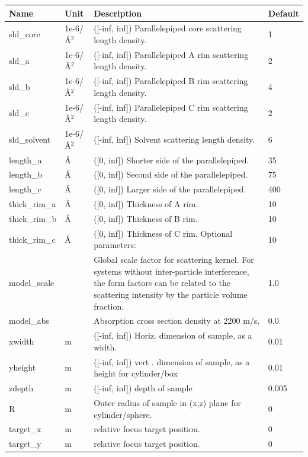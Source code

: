 \begin{longtable}{p{}p{}p{}p{}}
\toprule
\textbf{Name} & \textbf{Unit} & \textbf{Description} & \textbf{Default} \\
\midrule
\endhead
sld\_core & 1e-6/\AA{}$^{2}$ & ([-inf, inf]) Parallelepiped core scattering length density. & 1 \\
sld\_a & 1e-6/\AA{}$^{2}$ & ([-inf, inf]) Parallelepiped A rim scattering length density. & 2 \\
sld\_b & 1e-6/\AA{}$^{2}$ & ([-inf, inf]) Parallelepiped B rim scattering length density. & 4 \\
sld\_c & 1e-6/\AA{}$^{2}$ & ([-inf, inf]) Parallelepiped C rim scattering length density. & 2 \\
sld\_solvent & 1e-6/\AA{}$^{2}$ & ([-inf, inf]) Solvent scattering length density. & 6 \\
length\_a & \AA{} & ([0, inf]) Shorter side of the parallelepiped. & 35 \\
length\_b & \AA{} & ([0, inf]) Second side of the parallelepiped. & 75 \\
length\_c & \AA{} & ([0, inf]) Larger side of the parallelepiped. & 400 \\
thick\_rim\_a & \AA{} & ([0, inf]) Thickness of A rim. & 10 \\
thick\_rim\_b & \AA{} & ([0, inf]) Thickness of B rim. & 10 \\
thick\_rim\_c & \AA{} & ([0, inf]) Thickness of C rim. Optional parameters: & 10 \\
model\_scale &   & Global scale factor for scattering kernel. For systems without inter-particle interference, the form factors can be related to the scattering intensity by the particle volume fraction. & 1.0 \\
model\_abs &   & Absorption cross section density at 2200 m/s. & 0.0 \\
xwidth & m & ([-inf, inf]) Horiz. dimension of sample, as a width. & 0.01 \\
yheight & m & ([-inf, inf]) vert . dimension of sample, as a height for cylinder/box & 0.01 \\
zdepth & m & ([-inf, inf]) depth of sample & 0.005 \\
R & m & Outer radius of sample in (x,z) plane for cylinder/sphere. & 0 \\
target\_x & m & relative focus target position. & 0 \\
target\_y & m & relative focus target position. & 0 \\

\end{longtable}
